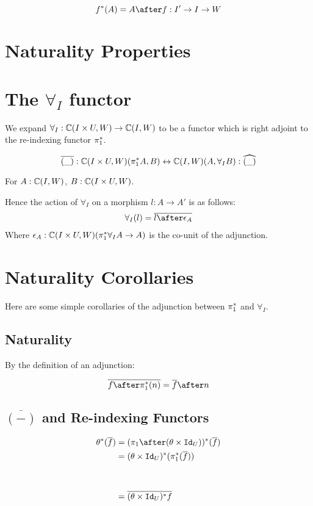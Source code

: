 \documentclass{report}
\newcommand{\allI}[0]{\forall_I}
\newcommand\ciw[0]{\C(I, W)}
\newcommand\ciuw[0]{\C(I\times U, W)}
\renewcommand\star[0]{^*}
\renewcommand\bar[1]{\overline{#1}}
\renewcommand\widehat[1]{%
\savestack{\tmpbox}{\stretchto{%
  \scaleto{%
    \scalerel*[\widthof{\ensuremath{#1}}]{\kern.1pt\mathchar"0362\kern.1pt}%
    {\rule{0ex}{\textheight}}%
  }{\textheight}%
}{2.4ex}}%
\stackon[-6.9pt]{#1}{\tmpbox}%
}
\newcommand\pstar[0]{\p\star}
\begin{document}
\begin{equation}
    f\star(A) = A\after f: I'\rightarrow I\rightarrow W
\end{equation}

\section{Naturality Properties}

\section{The $\allI$ functor}
We expand $\allI: \ciuw \rightarrow \ciw$ to be a functor which is right adjoint to the re-indexing functor $\pstar$.

\begin{equation}
    \bar{(\_)}: \ciuw(\pstar A, B) \leftrightarrow \ciw(A, \allI B) : \widehat{(\_)}
\end{equation}

For $A: \ciw$, $B: \ciuw$.

Hence the action of $\allI$ on a morphism $l : A\rightarrow A'$ is as follows:
\begin{eqnarray}
    \allI(l) = \bar{l\after\e_A}
\end{eqnarray}
Where $\e_A: \ciuw(\pstar\allI A \rightarrow A)$ is the co-unit of the adjunction.

\section{Naturality Corollaries}
Here are some simple corollaries of the adjunction between $\pstar$ and $\allI$.

\subsection{Naturality}
By the definition of an adjunction:

\begin{equation}
    \bar{f\after\pstar(n)} = \bar{f}\after n
\end{equation}

\subsection{$\bar{(-)}$ and Re-indexing Functors}

\begin{align}
    \theta\star(\bar{f}) & = (\p\after(\theta\times\Id{U}))\star(\bar{f})\\\
     &= (\theta\times\Id{U})\star(\p\star(\bar{f}))\\
     \\
     \\
     &= \bar{(\theta\times\Id{U})\star f}\\
     \\
\end{align}
\end{document}
